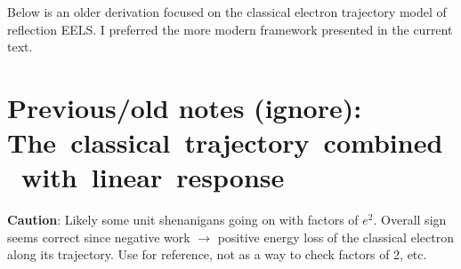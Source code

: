 \documentclass{article}
\begin{document}
\begin{appendix}



Below is an older derivation focused on the classical electron trajectory model of reflection EELS.  I preferred the more modern framework presented in the current text.



\section{Previous/old notes (ignore): \texorpdfstring{ \\}{ } The~classical~trajectory~combined~with~linear~response}
\label{section: old classical loss derivation}

{\bf Caution}: Likely some unit shenanigans going on with factors of $e^2$.  Overall sign seems correct since negative work $\to$ positive energy loss of the classical electron along its trajectory.  Use for reference, not as a way to check factors of 2, etc.



\end{appendix}
\end{document}
